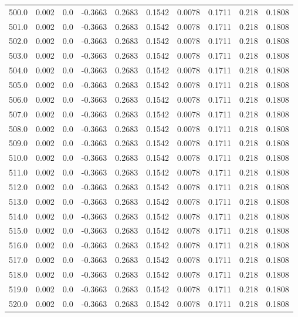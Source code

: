 \begin{longtable}{lrrrrrrrrr}
500.0 & 0.002 & 0.0 & -0.3663 & 0.2683 & 0.1542 & 0.0078 & 0.1711 & 0.218 & 0.1808 \\
501.0 & 0.002 & 0.0 & -0.3663 & 0.2683 & 0.1542 & 0.0078 & 0.1711 & 0.218 & 0.1808 \\
502.0 & 0.002 & 0.0 & -0.3663 & 0.2683 & 0.1542 & 0.0078 & 0.1711 & 0.218 & 0.1808 \\
503.0 & 0.002 & 0.0 & -0.3663 & 0.2683 & 0.1542 & 0.0078 & 0.1711 & 0.218 & 0.1808 \\
504.0 & 0.002 & 0.0 & -0.3663 & 0.2683 & 0.1542 & 0.0078 & 0.1711 & 0.218 & 0.1808 \\
505.0 & 0.002 & 0.0 & -0.3663 & 0.2683 & 0.1542 & 0.0078 & 0.1711 & 0.218 & 0.1808 \\
506.0 & 0.002 & 0.0 & -0.3663 & 0.2683 & 0.1542 & 0.0078 & 0.1711 & 0.218 & 0.1808 \\
507.0 & 0.002 & 0.0 & -0.3663 & 0.2683 & 0.1542 & 0.0078 & 0.1711 & 0.218 & 0.1808 \\
508.0 & 0.002 & 0.0 & -0.3663 & 0.2683 & 0.1542 & 0.0078 & 0.1711 & 0.218 & 0.1808 \\
509.0 & 0.002 & 0.0 & -0.3663 & 0.2683 & 0.1542 & 0.0078 & 0.1711 & 0.218 & 0.1808 \\
510.0 & 0.002 & 0.0 & -0.3663 & 0.2683 & 0.1542 & 0.0078 & 0.1711 & 0.218 & 0.1808 \\
511.0 & 0.002 & 0.0 & -0.3663 & 0.2683 & 0.1542 & 0.0078 & 0.1711 & 0.218 & 0.1808 \\
512.0 & 0.002 & 0.0 & -0.3663 & 0.2683 & 0.1542 & 0.0078 & 0.1711 & 0.218 & 0.1808 \\
513.0 & 0.002 & 0.0 & -0.3663 & 0.2683 & 0.1542 & 0.0078 & 0.1711 & 0.218 & 0.1808 \\
514.0 & 0.002 & 0.0 & -0.3663 & 0.2683 & 0.1542 & 0.0078 & 0.1711 & 0.218 & 0.1808 \\
515.0 & 0.002 & 0.0 & -0.3663 & 0.2683 & 0.1542 & 0.0078 & 0.1711 & 0.218 & 0.1808 \\
516.0 & 0.002 & 0.0 & -0.3663 & 0.2683 & 0.1542 & 0.0078 & 0.1711 & 0.218 & 0.1808 \\
517.0 & 0.002 & 0.0 & -0.3663 & 0.2683 & 0.1542 & 0.0078 & 0.1711 & 0.218 & 0.1808 \\
518.0 & 0.002 & 0.0 & -0.3663 & 0.2683 & 0.1542 & 0.0078 & 0.1711 & 0.218 & 0.1808 \\
519.0 & 0.002 & 0.0 & -0.3663 & 0.2683 & 0.1542 & 0.0078 & 0.1711 & 0.218 & 0.1808 \\
520.0 & 0.002 & 0.0 & -0.3663 & 0.2683 & 0.1542 & 0.0078 & 0.1711 & 0.218 & 0.1808 \\

\end{longtable}
